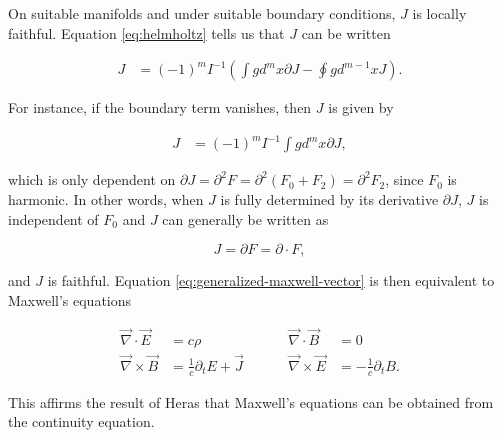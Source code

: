 \documentclass[twocolumn]{article}
\begin{document}



On suitable manifolds and under suitable boundary conditions, $J$ is locally faithful. Equation \ref{eq:helmholtz} tells us that $J$ can be written

\begin{align}
  J  &= (-1)^m I^{-1} \left(\int g d^{m}x \partial J - \oint g d^{m-1}x J \right).\label{eq:conditions}
\end{align}

For instance, if the boundary term vanishes, then $J$ is given by

\begin{align}
  J &= (-1)^m I^{-1} \int g d^{m}x \partial J,\label{eq:satisfied}
\end{align}

which is only dependent on $\partial J = \partial^2 F = \partial^2 (F_0 + F_2) = \partial^2 F_2$, since $F_0$ is harmonic. In other words, when $J$ is fully determined by its derivative $\partial J$, $J$ is independent of $F_0$ and $J$ can generally be written as 

\begin{equation}
  J = \partial F = \partial \cdot F,
\end{equation}

and $J$ is faithful. Equation \ref{eq:generalized-maxwell-vector} is then equivalent to Maxwell's equations

\begin{equation}
  \begin{aligned}
    \vec \nabla \cdot \vec E &= c \rho &\hspace{1cm} \vec \nabla \cdot \vec B &= 0 \\
    \vec \nabla \times \vec B &= \frac{1}{c}\partial_t E + \vec J &\hspace{1cm} \vec \nabla \times \vec E &= - \frac{1}{c}\partial_t B.\label{eq:maxwell-vector}
  \end{aligned}
\end{equation}

This affirms the result of Heras that Maxwell's equations can be obtained from the continuity equation.\cite{heras} 
\end{document}
